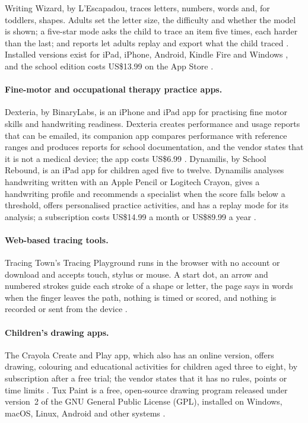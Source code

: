 \documentclass[12pt]{article}
\renewcommand{\_}{\textunderscore\allowbreak}%
\begin{document}
Writing Wizard, by L'Escapadou, traces letters, numbers, words and, for
toddlers, shapes. Adults set the letter size, the difficulty and whether the
model is shown; a five-star mode asks the child to trace an item five times,
each harder than the last; and reports let adults replay and export what the
child traced \citep{Abel2026WritingWizard}. Installed versions exist for iPad,
iPhone, Android, Kindle Fire and Windows \citep{LEscapadou2026WritingWizard},
and the school edition costs US\$13.99 on the App Store
\citep{Abel2026WritingWizard}.

\paragraph{Fine-motor and occupational therapy practice apps.}
Dexteria, by BinaryLabs, is an iPhone and iPad app for practising fine motor
skills and handwriting readiness. Dexteria creates performance and usage reports
that can be emailed, its companion app compares performance with reference
ranges and produces reports for school documentation, and the vendor states that
it is not a medical device; the app costs US\$6.99
\citep{BinaryLabs2026Dexteria}. Dynamilis, by School Rebound, is an iPad app for
children aged five to twelve. Dynamilis analyses handwriting written with an
Apple Pencil or Logitech Crayon, gives a handwriting profile and recommends a
specialist when the score falls below a threshold, offers personalised practice
activities, and has a replay mode for its analysis; a subscription costs
US\$14.99 a month or US\$89.99 a year \citep{SchoolRebound2026Dynamilis}.

\paragraph{Web-based tracing tools.}
Tracing Town's Tracing Playground runs in the browser with no account or
download and accepts touch, stylus or mouse. A start dot, an arrow and numbered
strokes guide each stroke of a shape or letter, the page says in words when the
finger leaves the path, nothing is timed or scored, and nothing is recorded or
sent from the device \citep{TracingTown2026Playground}.

\paragraph{Children's drawing apps.}
The Crayola Create and Play app, which also has an online version, offers
drawing, colouring and educational activities for children aged three to eight,
by subscription after a free trial; the vendor states that it has no rules,
points or time limits \citep{Crayola2026CreateAndPlay}. Tux Paint is a free,
open-source drawing program released under version~2 of the GNU General Public
License (GPL), installed on Windows, macOS, Linux, Android and other systems
\citep{TuxPaint2026Download}.
\end{document}
